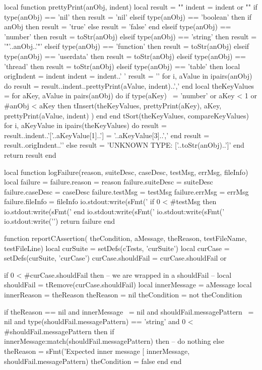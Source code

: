 local function prettyPrint(anObj, indent)
  local result = ""
  indent = indent or ""
  if type(anObj) == 'nil' then
    result = 'nil'
  elseif type(anObj) == 'boolean' then
    if anObj then result = 'true' else result = 'false' end
  elseif type(anObj) == 'number' then
    result = toStr(anObj)
  elseif type(anObj) == 'string' then
    result = '"'..anObj..'"'
  elseif type(anObj) == 'function' then
    result = toStr(anObj)
  elseif type(anObj) == 'userdata' then
    result = toStr(anObj)
  elseif type(anObj) == 'thread' then
    result = toStr(anObj)
  elseif type(anObj) == 'table' then
    local origIndent = indent
    indent = indent..'  '
    result = '{\n'
    for i, aValue in ipairs(anObj) do
      result = result..indent..prettyPrint(aValue, indent)..',\n'
    end
    local theKeyValues = { }
    for aKey, aValue in pairs(anObj) do
      if type(aKey) ~= 'number' or aKey < 1 or #anObj < aKey then
        tInsert(theKeyValues,
          { prettyPrint(aKey), aKey, prettyPrint(aValue, indent) })
      end
    end
    tSort(theKeyValues, compareKeyValues)
    for i, aKeyValue in ipairs(theKeyValues) do
      result = result..indent..'['..aKeyValue[1]..'] = '..aKeyValue[3]..',\n'
    end
    result = result..origIndent..'}'
  else
    result = 'UNKNOWN TYPE: ['..toStr(anObj)..']'
  end
  return result
end

local function logFailure(reason, suiteDesc, caseDesc,
                          testMsg, errMsg, fileInfo)
  local failure = {}
  failure.reason    = reason
  failure.suiteDesc = suiteDesc
  failure.caseDesc  = caseDesc
  failure.testMsg   = testMsg
  failure.errMsg    = errMsg
  failure.fileInfo  = fileInfo
  io.stdout:write(sFmt('    %
  if 0 < #testMsg then
    io.stdout:write(sFmt('    %
  end
  io.stdout:write(sFmt('    %
  io.stdout:write(sFmt('    %
  io.stdout:write('\n\n')
  return failure
end

function reportCAssertion(
  theCondition, aMessage, theReason,
  testFileName, testFileLine)
  local curSuite     = setDefs(cTests, 'curSuite')
  local curCase      = setDefs(curSuite, 'curCase')
  curCase.shouldFail = curCase.shouldFail or { }
  
  if 0 < #curCase.shouldFail then
    -- we are wrapped in a shouldFail
    --
    local shouldFail   = tRemove(curCase.shouldFail)
    local innerMessage = aMessage
    local innerReason  = theReason
    theReason          = nil
    theCondition       = not theCondition
  
    if theReason == nil
      and innerMessage ~= nil
      and shouldFail.messagePattern ~= nil
      and type(shouldFail.messagePattern) == 'string'
      and 0 < #shouldFail.messagePattern then
      if innerMessage:match(shouldFail.messagePattern) then
        -- do nothing
      else
        theReason = sFmt('Expected inner message [%
          innerMessage, shouldFail.messagePattern)
        theCondition = false
      end
    end

